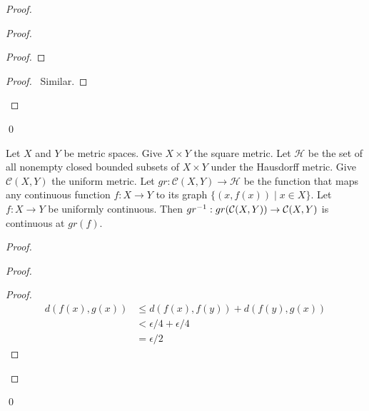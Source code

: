 \begin{proof}
    \pf
    \begin{proof}
        \begin{proof}
        \end{proof}
        \begin{proof}
            \pf\ Similar.
        \end{proof}
    \end{proof}
    \qed
\end{proof}

\begin{proposition}
    Let $X$ and $Y$ be metric spaces. Give $X \times Y$ the square metric. Let $\mathcal{H}$ be the set of all nonempty closed bounded
    subsets of $X \times Y$ under the Hausdorff metric. Give $\mathcal{C}(X,Y)$ the uniform metric. Let $gr : \mathcal{C}(X,Y) \rightarrow
    \mathcal{H}$ be the function that maps any continuous function $f : X \rightarrow Y$ to its graph $\{ (x, f(x)) \mid x \in X \}$.
    Let $f : X \rightarrow Y$ be uniformly continuous. Then ${gr}^{-1} : gr(\mathcal{C}(X,Y)) \rightarrow \mathcal{C}(X,Y)$
    is continuous at $gr(f)$.
\end{proposition}

\begin{proof}
    \pf
    \begin{proof}
        \begin{proof}
            \pf
            \begin{align*}
                d(f(x),g(x)) & \leq d(f(x),f(y)) + d(f(y),g(x)) \\
                & < \epsilon / 4 + \epsilon / 4 \\
                & = \epsilon / 2
            \end{align*}
        \end{proof}
    \end{proof}
    \qed
\end{proof}

